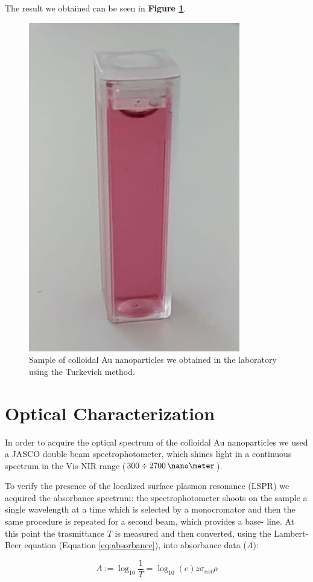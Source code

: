 \documentclass[twocolumn]{article}
\begin{document}
\begin{multicols}{2}
The result we obtained can be seen in \textbf{Figure \ref{fig:sample}}.

\begin{figure}[H]
    \centering
    \includegraphics[width=0.45\linewidth]{image/data/turkevich.pdf}
    \caption{Sample of colloidal Au nanoparticles we obtained in the laboratory using the Turkevich method.}
    \label{fig:sample}
\end{figure}

\clearpage

\section{Optical Characterization}
\label{sec:optic_char}
\noindent
In order to acquire the optical spectrum of the colloidal Au nanoparticles we used a JASCO double beam spectrophotometer, which shines light in a continuous spectrum in the Vis-NIR range ($300\div 2700\, \nano\meter $).

To verify the presence of the localized surface plasmon resonance (LSPR) we acquired the absorbance spectrum: the spectrophotometer shoots on the sample a single wavelength at a time which is selected by a monocromator and then the same procedure is repeated for a second beam, which provides a base-
line. At this point the trasmittance $T$ is measured and then converted, using the Lambert-Beer equation (Equation \ref{eq:absorbance}), into absorbance data ($A$): 

\begin{equation}
    A:=\log_{10}\frac{1}{T}=\log_{10}(e)z \sigma_{ext} \rho
    \label{eq:absorbance}
\end{equation}


\end{multicols}
\end{document}
